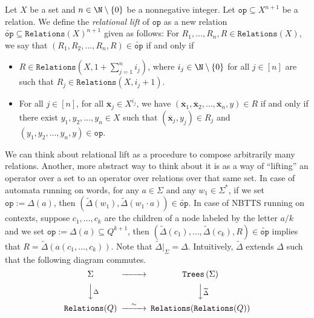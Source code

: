 \documentclass[12pt, a4paper]{article}
\newcommand{\x}{\overline{\textbf{x}}}
\newcommand{\Alphabet}{\ensuremath{\Sigma}}
\newcommand{\Trees}[1]{\ensuremath{\texttt{Trees}\left(#1\right)}}
\newcommand{\Transitions}{\ensuremath{\Delta}}
\newcommand{\operator}{\texttt{op}}
\newcommand{\Relations}{\texttt{Relations}}
\begin{document}
\begin{definition}\label{def:relationalLift}
    Let $X$ be a set and $n \in \N\setminus\{0\}$ be a nonnegative integer. Let $\operator \subseteq X^{n+1}$ be a relation. We define the \emph{relational lift} of $\operator$ as a new relation $\widetilde{\operator} \subseteq \Relations(X)^{n+1}$ given as follows: For $R_1, \dots, R_n, R \in \Relations(X)$, we say that $(R_1, R_2, \dots, R_n, R) \in \widetilde{\operator}$ if and only if
    \begin{itemize}
        \item $R \in \Relations\left(X, 1+\sum_{j=1}^n i_j\right)$, where $i_j \in \N\setminus\{0\}$ for all $j \in [n]$ are such that $R_j \in \Relations(X, i_j+1)$.
        \item For all $j \in [n]$, for all $\x_j \in X^{i_j}$, we have
            $(\x_1, \x_2, \dots, \x_n, y) \in R$ if and only if there
            exist $y_1, y_2, \dots, y_n \in X$ such that $(\x_j, y_j)
            \in R_j$ and $(y_1, y_2, \dots, y_n,
            y) \in \operator$.
    \end{itemize}    
\end{definition}

We can think about relational lift as a procedure to compose
arbitrarily many relations. Another, more abstract way to think about it is as a way
of ``lifting'' an operator over a set to an operator over relations
over that same set. In case of automata running on words, for any $a
\in \Alphabet$ and any $w_{1} \in \Alphabet^{*}$, if we set $\operator
:= \Transitions(a)$, then $(\widetilde{\Transitions}(w_{1}),
\widetilde{\Transitions}(w_{1}\cdot a)) \in
\widetilde{\operator}$. In case of NBTTS running on contexts,
suppose $c_{1}, \ldots, c_{k}$ are the children of a node labeled
by the letter $a/k$ and we set $\operator := \Transitions(a)
\subseteq Q^{k+1}$, then $(\widetilde{\Transitions}(c_{1}),
\ldots, \widetilde{\Transitions}(c_{k}), R) \in
\widetilde{\operator}$ implies that $R =
\widetilde{\Transitions}(a(c_{1}, \ldots, c_{k}))$.
Note that $\widetilde{\Transitions}|_{\Alphabet} = \Transitions$.
Intuitively, $\widetilde{\Transitions}$ extends $\Transitions$ such
that the following diagram commutes.
   \[\begin{CD}
       \Alphabet @>>> \Trees{\Alphabet}\\
       @VV\Transitions V @VV\widetilde{\Transitions}V\\
       \Relations(Q) @>\sim>> \Relations(\Relations(Q))
   \end{CD}\]
\end{document}
